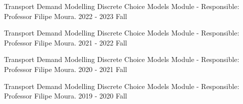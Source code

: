 

\begin{cvteachings}
  \cvteaching
	{Transport Demand Modelling} %
	{Discrete Choice Models Module - Responsible: Professor Filipe Moura.} %
	{} %
	{2022 - 2023 Fall} %

  \cvteaching
    {Transport Demand Modelling} %
    {Discrete Choice Models Module - Responsible: Professor Filipe Moura.} %
    {} %
    {2021 - 2022 Fall} %

  \cvteaching
    {Transport Demand Modelling} %
    {Discrete Choice Models Module - Responsible: Professor Filipe Moura.} %
    {} %
    {2020 - 2021 Fall} %

  \cvteaching
    {Transport Demand Modelling} %
    {Discrete Choice Models Module - Responsible: Professor Filipe Moura.} %
    {} %
    {2019 - 2020 Fall} %


\end{cvteachings}

